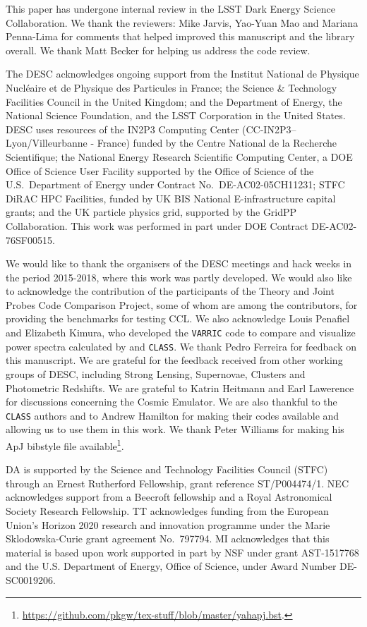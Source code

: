 %
This paper has undergone internal review in the LSST Dark Energy Science Collaboration. We thank the reviewers: Mike Jarvis, Yao-Yuan Mao and Mariana Penna-Lima for comments that helped improved this manuscript and the \ccl library overall. We thank Matt Becker for helping us address the \ccl code review.

The DESC acknowledges ongoing support from the Institut National de Physique Nucl\'eaire et de Physique des Particules in France; the Science \& Technology Facilities Council in the United Kingdom; and the Department of Energy, the National Science Foundation, and the LSST Corporation in the United States.  DESC uses resources of the IN2P3 Computing Center (CC-IN2P3--Lyon/Villeurbanne - France) funded by the Centre National de la Recherche Scientifique; the National Energy Research Scientific Computing Center, a DOE Office of Science User Facility supported by the Office of Science of the U.S.\ Department of Energy under Contract No.\ DE-AC02-05CH11231; STFC DiRAC HPC Facilities, funded by UK BIS National E-infrastructure capital grants; and the UK particle physics grid, supported by the GridPP Collaboration. This work was performed in part under DOE Contract DE-AC02-76SF00515. 

We would like to thank the organisers of the DESC meetings and hack weeks in the period 2015-2018, where this work was partly developed. We would also like to acknowledge the contribution of the participants of the Theory and Joint Probes Code Comparison Project, some of whom are among the \ccl contributors, for providing the benchmarks for testing CCL. We also acknowledge Louis Penafiel and Elizabeth Kimura, who developed the {\tt VARRIC} code to compare and visualize power spectra calculated by \ccl and {\tt CLASS}. We thank Pedro Ferreira for feedback on this manuscript. We are grateful for the feedback received from other working groups of DESC, including Strong Lensing, Supernovae, Clusters and Photometric Redshifts. We are grateful to Katrin Heitmann and Earl Lawerence for discussions concerning the Cosmic Emulator. We are also thankful to the {\tt CLASS} authors and to Andrew Hamilton for making their codes available and allowing us to use them in this work. We thank Peter Williams for making his ApJ bibstyle file available\footnote{\url{https://github.com/pkgw/tex-stuff/blob/master/yahapj.bst}.}.  
%

DA is supported by the Science and Technology Facilities Council (STFC) through an Ernest Rutherford Fellowship, grant reference ST/P004474/1. NEC acknowledges support from a Beecroft fellowship and a Royal Astronomical Society Research Fellowship. TT acknowledges funding from the European Union's Horizon 2020 research and innovation programme under the Marie Sk{l}odowska-Curie grant agreement No.\ 797794. MI acknowledges that this material is based upon work supported in part by NSF under grant AST-1517768 and the U.S. Department of Energy, Office of Science, under Award Number DE-SC0019206.
